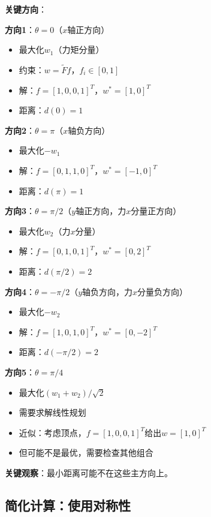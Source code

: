 \documentclass[12pt,a4paper]{article}
\begin{document}
\textbf{关键方向}：

\textbf{方向1}：$\theta = 0$（$x$轴正方向）
\begin{itemize}
\item 最大化$w_1$（力矩分量）
\item 约束：$w = \tilde{F} f$，$f_i \in [0,1]$
\item 解：$f = [1, 0, 0, 1]^T$，$w^* = [1, 0]^T$
\item 距离：$d(0) = 1$
\end{itemize}

\textbf{方向2}：$\theta = \pi$（$x$轴负方向）
\begin{itemize}
\item 最大化$-w_1$
\item 解：$f = [0, 1, 1, 0]^T$，$w^* = [-1, 0]^T$
\item 距离：$d(\pi) = 1$
\end{itemize}

\textbf{方向3}：$\theta = \pi/2$（$y$轴正方向，力$x$分量正方向）
\begin{itemize}
\item 最大化$w_2$（力$x$分量）
\item 解：$f = [0, 1, 0, 1]^T$，$w^* = [0, 2]^T$
\item 距离：$d(\pi/2) = 2$
\end{itemize}

\textbf{方向4}：$\theta = -\pi/2$（$y$轴负方向，力$x$分量负方向）
\begin{itemize}
\item 最大化$-w_2$
\item 解：$f = [1, 0, 1, 0]^T$，$w^* = [0, -2]^T$
\item 距离：$d(-\pi/2) = 2$
\end{itemize}

\textbf{方向5}：$\theta = \pi/4$
\begin{itemize}
\item 最大化$(w_1 + w_2)/\sqrt{2}$
\item 需要求解线性规划
\item 近似：考虑顶点，$f = [1, 0, 0, 1]^T$给出$w = [1, 0]^T$
\item 但可能不是最优，需要检查其他组合
\end{itemize}

\textbf{关键观察}：最小距离可能不在这些主方向上。

\subsection{简化计算：使用对称性}
\end{document}
